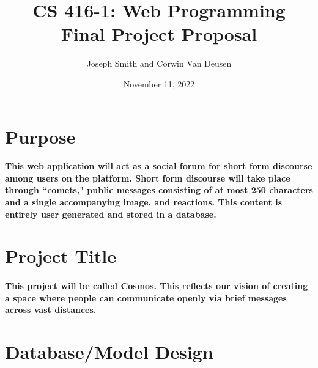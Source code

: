\documentclass{article}
\title{CS 416-1: Web Programming \\ \large{Final Project Proposal}}
\author{Joseph Smith and Corwin Van Deusen}
\date{November 11, 2022}
\begin{document}
    \maketitle
    
    \section{Purpose}
    \paragraph{This web application will act as a social forum for short form discourse among users on the platform. Short form discourse will take place through ``comets," public messages consisting of at most 250 characters and a single accompanying image, and reactions. This content is entirely user generated and stored in a database.}
    
    \section{Project Title}
    \paragraph{This project will be called Cosmos. This reflects our vision of creating a space where people can communicate openly via brief messages across vast distances.}
    
    \newpage
    
    \section{Database/Model Design}
\end{document}
